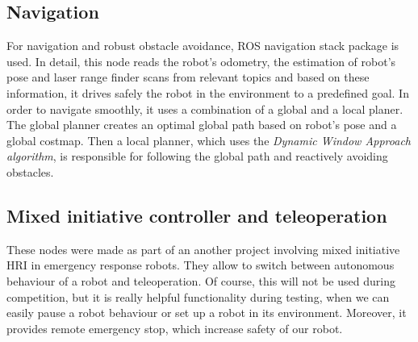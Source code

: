\documentclass[conference]{IEEEtran}
\begin{document}
\subsection{\label{sec:navig}Navigation}
For navigation and robust obstacle avoidance, ROS \textsf{navigation stack} package is used. In detail, this node reads the robot's odometry, the estimation of robot's pose and laser range finder scans from relevant topics and based on these information, it drives safely the robot in the environment to a predefined goal. In order to navigate smoothly, it uses a combination of a global and a local planer. The global planner creates an optimal global path based on robot's pose and a global costmap. Then a local planner, which uses the \textit{Dynamic Window Approach algorithm}, is responsible for following the global path and reactively avoiding obstacles.

\subsection{Mixed initiative controller and teleoperation}

These nodes were made as part of an another project involving mixed initiative HRI in emergency response robots. They allow to switch between autonomous behaviour of a robot and teleoperation. Of course, this will not be used during competition, but it is really helpful functionality during testing, when we can easily pause a robot behaviour or set up a robot in its environment. Moreover, it provides remote emergency stop, which increase safety of our robot.
\end{document}
